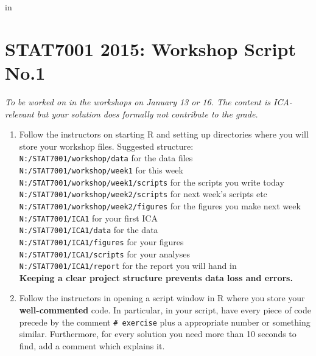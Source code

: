
\topmargin   -3cm
\textwidth   6.2in
 in



\section*{STAT7001 2015: Workshop Script No.1}
{\em To be worked on in the workshops on January 13 or 16. The content is ICA-relevant but your solution does formally not contribute to the grade.}

\begin{enumerate}

\item Follow the instructors on starting R and setting up directories where you will store your workshop files. Suggested structure:\\
\texttt{N:/STAT7001/workshop/data} for the data files\\
\texttt{N:/STAT7001/workshop/week1} for this week\\
\texttt{N:/STAT7001/workshop/week1/scripts} for the scripts you write today\\
\texttt{N:/STAT7001/workshop/week2/scripts} for next week's scripts etc\\
\texttt{N:/STAT7001/workshop/week2/figures} for the figures you make next week\\
\texttt{N:/STAT7001/ICA1} for your first ICA\\
\texttt{N:/STAT7001/ICA1/data} for the data\\
\texttt{N:/STAT7001/ICA1/figures} for your figures\\
\texttt{N:/STAT7001/ICA1/scripts} for your analyses\\
\texttt{N:/STAT7001/ICA1/report} for the report you will hand in\\
{\bf Keeping a clear project structure prevents data loss and errors.}

\item Follow the instructors in opening a script window in R where you store your {\bf well-commented} code. In particular, in your script, have every piece of code precede by the comment \texttt{\# exercise} plus a appropriate number or something similar. Furthermore, for every solution you need more than 10 seconds to find, add a comment which explains it.


\end{enumerate}
